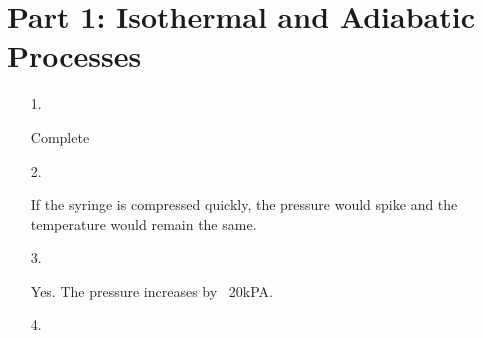 ﻿\documentclass[12pt, letterpaper]{article}
\begin{document}
    \section*{Part 1: Isothermal and Adiabatic Processes}

    \begin{enumerate}
        \item [1.]\mbox{}
        \begin{mdframed}
            Complete
        \end{mdframed}

        \item [2.]\mbox{}
        \begin{mdframed}
            If the syringe is compressed quickly, the pressure would spike and the temperature would remain the same.
        \end{mdframed}

        \item [3.]\mbox{}
        \begin{mdframed}
            Yes. The pressure increases by ~20kPA.
        \end{mdframed}

        \item [4.]\mbox{}
        \begin{mdframed}
            
        \end{mdframed}
    \end{enumerate}
\end{document}

